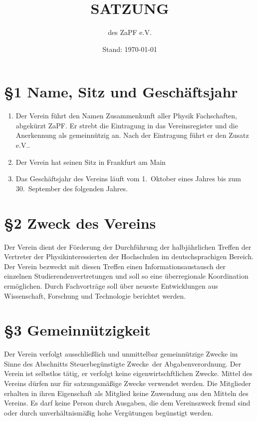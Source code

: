 \documentclass[ngerman]{article}
\begin{document}
\title{SATZUNG}
\date{Stand: \today}

\author{des \textquotedbl{}ZaPF
e.V.\textquotedbl{}}

\maketitle



\section*{§1 Name, Sitz und Geschäftsjahr}
\begin{enumerate}
\item Der Verein führt den Namen \glqq Zusammenkunft aller Physik Fachschaften\grqq, abgekürzt \glqq ZaPF\grqq. Er strebt die Eintragung in das Vereinsregister und die Anerkennung als gemeinnützig an. Nach der Eintragung führt er den Zusatz \glqq e.V.\grqq.
\item Der Verein hat seinen Sitz in Frankfurt am Main
\item Das Geschäftsjahr des Vereins läuft vom 1.~Oktober eines Jahres bis zum 30.~September des folgenden Jahres.
\end{enumerate}


\section*{§2 Zweck des Vereins}
Der Verein dient der Förderung der Durchführung der halbjährlichen Treffen der Vertreter der Physikinteressierten der Hochschulen im deutschsprachigen Bereich. %
Der Verein bezweckt mit diesen Treffen einen Informationsaustausch der einzelnen Studierendenvertretungen und soll so eine überregionale Koordination ermöglichen. Durch Fachvorträge soll über neueste Entwicklungen aus Wissenschaft, Forschung und Technologie berichtet werden.


\section*{§3 Gemeinnützigkeit}
Der Verein verfolgt ausschließlich und unmittelbar gemeinnützige Zwecke im Sinne des Abschnitts \glqq Steuerbegünstigte Zwecke\grqq\ der Abgabenverordnung. Der Verein ist selbstlos tätig, er verfolgt keine eigenwirtschftlichen Zwecke. Mittel des Vereins dürfen nur für satzungsmäßige Zwecke verwendet werden. Die Mitglieder erhalten in
ihren Eigenschaft als Mitglied keine Zuwendung aus den Mitteln des Vereins. Es darf keine Person durch Ausgaben, die dem Vereinszweck fremd sind oder durch unverhältnismäßig hohe Vergütungen begünstigt werden.
\end{document}

